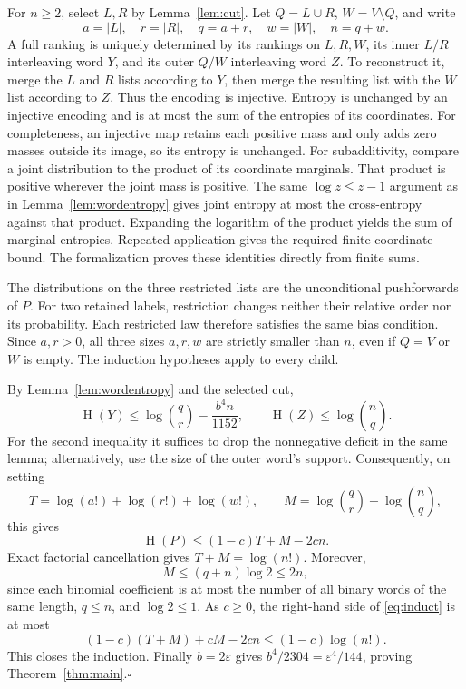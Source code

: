 \documentclass[11pt,a4paper]{article}
\newcommand{\eps}{\varepsilon}
\DeclareMathOperator{\Ent}{H}
\begin{document}
For $n\geq2$, select $L,R$ by Lemma~\ref{lem:cut}. Let $Q=L\cup R$,
$W=V\setminus Q$, and write
\[
a=|L|,\quad r=|R|,\quad q=a+r,\quad w=|W|,\quad n=q+w.
\]
A full ranking is uniquely determined by its rankings on $L,R,W$, its
inner $L/R$ interleaving word $Y$, and its outer $Q/W$ interleaving word $Z$.
To reconstruct it, merge the $L$ and $R$ lists according to $Y$, then merge
the resulting list with the $W$ list according to $Z$. Thus the encoding is
injective. Entropy is unchanged by an injective encoding and is at most
the sum of the entropies of its coordinates. For completeness, an injective map retains each positive mass and only
adds zero masses outside its image, so its entropy is unchanged. For
subadditivity, compare a joint distribution to the product of its coordinate
marginals. That product is positive wherever the joint mass is positive.
The same $\log z\leq z-1$ argument as in Lemma~\ref{lem:wordentropy}
gives joint entropy at most the cross-entropy against that product.
Expanding the logarithm of the product yields the sum of marginal
entropies. Repeated application gives the required finite-coordinate bound.
The formalization proves these identities directly from finite sums.

The distributions on the three restricted lists are the unconditional
pushforwards of $P$. For two retained labels, restriction changes neither
their relative order nor its probability. Each restricted law therefore
satisfies the same bias condition. Since $a,r>0$, all three sizes $a,r,w$
are strictly smaller than $n$, even if $Q=V$ or $W$ is empty. The induction
hypotheses apply to every child.

By Lemma~\ref{lem:wordentropy} and the selected cut,
\[
\Ent(Y)\leq\log\binom qr-\frac{b^4n}{1152},
\qquad \Ent(Z)\leq\log\binom nq.
\]
For the second inequality it suffices to drop the nonnegative deficit in
the same lemma; alternatively, use the size of the outer word's support.
Consequently, on setting
\[
T=\log(a!)+\log(r!)+\log(w!),\qquad
M=\log\binom qr+\log\binom nq,
\]
this gives
\begin{equation}\label{eq:induct}
\Ent(P)\leq(1-c)T+M-2cn.
\end{equation}
Exact factorial cancellation gives $T+M=\log(n!)$. Moreover,
\[
M\leq(q+n)\log2\leq2n,
\]
since each binomial coefficient is at most the number of all binary words
of the same length, $q\leq n$, and $\log2\leq1$. As $c\geq0$, the right-hand
side of \eqref{eq:induct} is at most
\[
(1-c)(T+M)+cM-2cn\leq(1-c)\log(n!).
\]
This closes the induction. Finally $b=2\eps$ gives
$b^4/2304=\eps^4/144$, proving Theorem~\ref{thm:main}.\hfill$\square$
\end{document}
